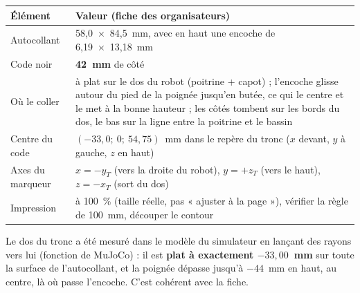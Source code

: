 \documentclass[11pt,a4paper]{article}
\newcommand{\code}[1]{\texttt{\detokenize{#1}}}
\begin{document}
\begin{center}
\renewcommand{\arraystretch}{1.2}
\begin{tabularx}{\textwidth}{l X}
\toprule
Élément & Valeur (fiche des organisateurs) \\
\midrule
Autocollant & 58,0~×~84,5~mm, avec en haut une encoche de 6,19~×~13,18~mm \\
Code noir & \textbf{42~mm} de côté \\
Où le coller & à plat sur le dos du robot (poitrine + capot) ; l'encoche glisse autour du pied de la poignée
               jusqu'en butée, ce qui le centre et le met à la bonne hauteur ; les côtés tombent sur les bords du dos,
               le bas sur la ligne entre la poitrine et le bassin \\
Centre du code & $(-33{,}0;\ 0;\ 54{,}75)$~mm dans le repère du tronc ($x$ devant, $y$ à gauche, $z$ en haut) \\
Axes du marqueur & $x = -y_T$ (vers la droite du robot), $y = +z_T$ (vers le haut), $z = -x_T$ (sort du dos) \\
Impression & à 100~\% (taille réelle, pas « ajuster à la page »), vérifier la règle de 100~mm, découper le contour \\
\bottomrule
\end{tabularx}
\end{center}

Le dos du tronc a été mesuré dans le modèle du simulateur en lançant des rayons vers lui (fonction
\code{mj_ray} de MuJoCo) : il est \textbf{plat à exactement $-33{,}00$~mm} sur toute la surface de l'autocollant,
et la poignée dépasse jusqu'à $-44$~mm en haut, au centre, là où passe l'encoche. C'est cohérent avec la fiche.
\end{document}
